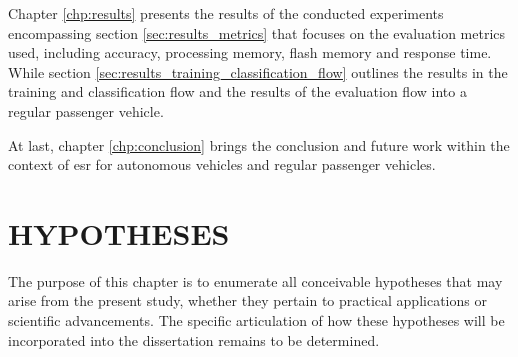 Chapter \ref{chp:results} presents the results of the conducted experiments encompassing section \ref{sec:results_metrics} that focuses on the evaluation metrics used, including accuracy, processing memory, flash memory and response time. While section \ref{sec:results_training_classification_flow} outlines the results in the training and classification flow and the results of the evaluation flow into a regular passenger vehicle.

At last, chapter \ref{chp:conclusion} brings the conclusion and future work within the context of \gls{esr} for autonomous vehicles and regular passenger vehicles.


\section{HYPOTHESES}
\label{sec:introduction_hypotheses}

The purpose of this chapter is to enumerate all conceivable hypotheses that may arise from the present study, whether they pertain to practical applications or scientific advancements. The specific articulation of how these hypotheses will be incorporated into the dissertation remains to be determined.

